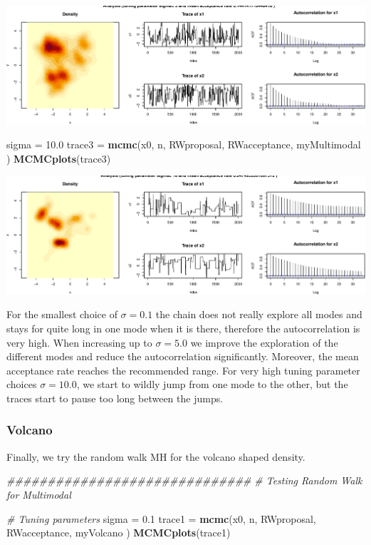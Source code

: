 \documentclass[
]{article}
\newenvironment{Shaded}{\begin{snugshade}}{\end{snugshade}}
\newcommand{\CommentTok}[1]{\textcolor[rgb]{0.56,0.35,0.01}{\textit{#1}}}
\newcommand{\FloatTok}[1]{\textcolor[rgb]{0.00,0.00,0.81}{#1}}
\newcommand{\KeywordTok}[1]{\textcolor[rgb]{0.13,0.29,0.53}{\textbf{#1}}}
\newcommand{\NormalTok}[1]{#1}
\newcommand{\StringTok}[1]{\textcolor[rgb]{0.31,0.60,0.02}{#1}}
\begin{document}
\includegraphics{Project1_files/figure-latex/RandomWalk2-3.pdf}

\begin{Shaded}
\begin{Highlighting}[]
\NormalTok{sigma =}\StringTok{ }\FloatTok{10.0}
\NormalTok{trace3 =}\StringTok{ }\KeywordTok{mcmc}\NormalTok{(x0, n, RWproposal, RWacceptance, myMultimodal )}
\KeywordTok{MCMCplots}\NormalTok{(trace3)}
\end{Highlighting}
\end{Shaded}

\includegraphics{Project1_files/figure-latex/RandomWalk2-4.pdf}

For the smallest choice of \(\sigma=0.1\) the chain does not really
explore all modes and stays for quite long in one mode when it is there,
therefore the autocorrelation is very high. When increasing up to
\(\sigma=5.0\) we improve the exploration of the different modes and
reduce the autocorrelation significantly. Moreover, the mean acceptance
rate reaches the recommended range. For very high tuning parameter
choices \(\sigma=10.0\), we start to wildly jump from one mode to the
other, but the traces start to pause too long between the jumps.

\hypertarget{volcano}{%
\subsubsection{Volcano}\label{volcano}}

Finally, we try the random walk MH for the volcano shaped density.

\begin{Shaded}
\begin{Highlighting}[]
\CommentTok{##############################}
\CommentTok{# Testing Random Walk for Multimodal}

\CommentTok{# Tuning parameters}
\NormalTok{sigma =}\StringTok{ }\FloatTok{0.1}
\NormalTok{trace1 =}\StringTok{ }\KeywordTok{mcmc}\NormalTok{(x0, n, RWproposal, RWacceptance, myVolcano )}
\KeywordTok{MCMCplots}\NormalTok{(trace1)}
\end{Highlighting}
\end{Shaded}
\end{document}
